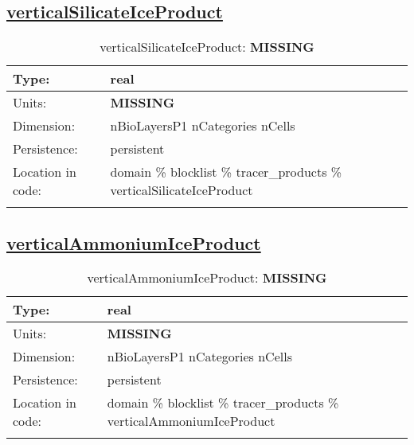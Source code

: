 \subsection[verticalSilicateIceProduct]{\hyperref[sec:var_tab_tracer_products]{verticalSilicateIceProduct}}
\label{subsec:var_sec_tracer_products_verticalSilicateIceProduct}
\begin{center}
\begin{longtable}{| p{2.0in} | p{4.0in} |}
        \hline 
        Type: & real \\
        \hline 
        Units: & {\bf \color{red} MISSING} \\
        \hline 
        Dimension: & nBioLayersP1 nCategories nCells \\
        \hline 
        Persistence: & persistent \\
        \hline 
         Location in code: & domain \% blocklist \% tracer\_products \% verticalSilicateIceProduct \\
         \hline 
    \caption{verticalSilicateIceProduct: {\bf \color{red} MISSING}}
\end{longtable}
\end{center}
\subsection[verticalAmmoniumIceProduct]{\hyperref[sec:var_tab_tracer_products]{verticalAmmoniumIceProduct}}
\label{subsec:var_sec_tracer_products_verticalAmmoniumIceProduct}
\begin{center}
\begin{longtable}{| p{2.0in} | p{4.0in} |}
        \hline 
        Type: & real \\
        \hline 
        Units: & {\bf \color{red} MISSING} \\
        \hline 
        Dimension: & nBioLayersP1 nCategories nCells \\
        \hline 
        Persistence: & persistent \\
        \hline 
         Location in code: & domain \% blocklist \% tracer\_products \% verticalAmmoniumIceProduct \\
         \hline 
    \caption{verticalAmmoniumIceProduct: {\bf \color{red} MISSING}}
\end{longtable}
\end{center}
